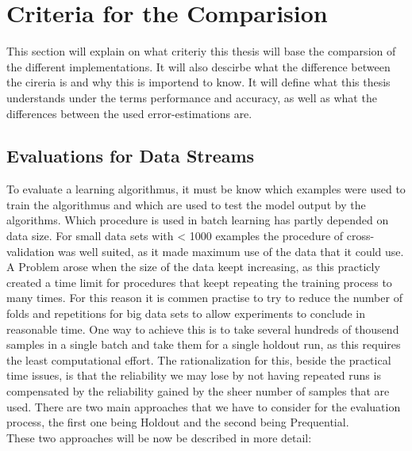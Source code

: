 \documentclass[12pt,oneside,a4paper,parskip]{scrbook}
\begin{document}
\section{Criteria for the Comparision}

This section will explain on what criteriy this thesis will base the comparsion of the different implementations. 
It will also descirbe what the difference between the cireria is and why this is importend to know.
It will define what this thesis understands under the terms performance and accuracy, as well as what the differences
between the used error-estimations are.

\subsection{Evaluations for Data Streams}
To evaluate a learning algorithmus, it must be know which examples were used to train the algorithmus and which are used to 
test the model output by the algorithms. Which procedure is used in batch learning has partly depended on data size.
For small data sets with < 1000 examples the procedure of cross-validation was well suited, as it made maximum use of the
data that it could use.
A Problem arose when the size of the data keept increasing, as this practicly created a time limit for procedures that keept
repeating the training process to many times.
For this reason it is commen practise to try to reduce the number of folds and repetitions for big data sets to allow experiments
to conclude in reasonable time. 
One way to achieve this is to take several hundreds of thousend samples in a single batch and take them for a single holdout run,
as this requires the least computational effort. The rationalization for this, beside the practical time issues, is that the 
reliability we may lose by not having repeated runs is compensated by the reliability gained by the sheer number of samples that are used. 
There are two main approaches that we have to consider for the evaluation process, the first one being Holdout and the second being 
Prequential. \cite{Bifet_datastream} \\
These two approaches will be now be described in more detail:
\end{document}
